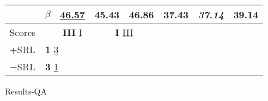 {{\begin{tabular}{llccc|ccc}
    \multicolumn{1}{c}{}                       & $\beta$   & \multicolumn{1}{c|}{\underline{46.57}}          & \multicolumn{1}{c}{45.43}             & \multicolumn{1}{c|}{\textbf{46.86}}    & \multicolumn{1}{c|}{37.43}          & \multicolumn{1}{c}{\textit{37.14}} & \multicolumn{1}{c}{39.14}          \\ \hline\hline
    \multicolumn{1}{c}{Scores}                 &           & \multicolumn{1}{c|}{\textbf{III} \underline{I}} & \multicolumn{2}{c|}{\textbf{I} \underline{III}}                                & \multicolumn{1}{c|}{}               & \multicolumn{2}{c}{}                                                    \\ \cline{1-2}
    \multicolumn{1}{c}{+SRL}                   & \multicolumn{3}{l}{\textbf{1} \underline{3}} \\
    \multicolumn{1}{c}{$-$SRL}                 & \multicolumn{3}{l}{\textbf{3} \underline{1}}

    \end{tabular}
  }
}{Results-QA}

